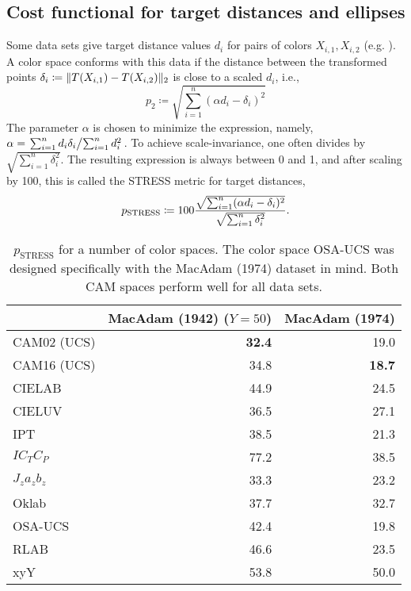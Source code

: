 \documentclass{scrartcl}
\theoremstyle{named}
\DeclarePairedDelimiter{\norm}{\lVert}{\rVert}
\begin{document}
\subsection{Cost functional for target distances and ellipses}

Some data sets give target distance values $d_i$ for pairs of colors $X_{i,1}, X_{i,2}$
(e.g. \cite{macadam1974}). A color space conforms with this data if the distance
between the transformed points
$\delta_i \coloneqq \norm{T(X_{i,1}) - T(X_{i,2})}_2$
is close to a scaled $d_i$, i.e.,
\begin{equation}\label{eq:p}
  p_2
  \coloneqq \sqrt{\sum_{i=1}^n (\alpha d_i - \delta_i)^2}
\end{equation}
The parameter $\alpha$ is chosen to minimize the expression, namely, $\alpha =
\left.\sum_{i=1}^n d_i \delta_i \middle/ \sum_{i=1}^n d_i^2\right.$.
To achieve scale-invariance, one often divides by
$\sqrt{\sum_{i=1}^n \delta_i^2}$.
The resulting expression is always between 0 and 1, and after scaling by 100, this is
called the STRESS metric for target distances,
\begin{equation}\label{eq:p}
  p_{\text{STRESS}}
  \coloneqq
  100
  \frac{%
    \sqrt{\sum_{i=1}^n (\alpha d_i - \delta_i)^2}
  }{
    \sqrt{\sum_{i=1}^n \delta_i^2}
  }.
\end{equation}

\begin{table}
  \centering
  \begin{tabular}{lrr}
    \toprule
    & MacAdam (1942) ($Y=50$) & MacAdam (1974)\\
    \midrule
CAM02 (UCS) & \textbf{32.4} &         19.0\\
CAM16 (UCS) &         34.8  & \textbf{18.7}\\
CIELAB      &         44.9  &         24.5\\
CIELUV      &         36.5  &         27.1\\
IPT         &         38.5  &         21.3\\
$IC_TC_P$   &         77.2  &         38.5\\
$J_za_zb_z$ &         33.3  &         23.2\\
Oklab       &         37.7  &         32.7\\
OSA-UCS     &         42.4  &         19.8\\
RLAB        &         46.6  &         23.5\\
xyY         &         53.8  &         50.0\\
    \bottomrule
  \end{tabular}
  \caption{$p_\text{STRESS}$ for a number of color spaces. The color space OSA-UCS was
  designed specifically with the MacAdam (1974) dataset in mind. Both CAM spaces perform
  well for all data sets.}
\end{table}
\end{document}

